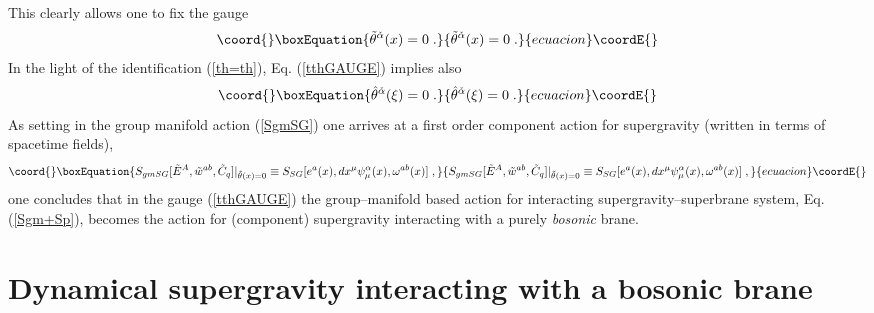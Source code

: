 \documentclass[a4paper,11pt]{article}
\begin{document}
This clearly allows one to fix the gauge 
 \begin{equation}\coord{}\boxEquation{
  \label{tthGAUGE} 
\tilde{\theta}^{\check{\alpha}}(x)=  0 \; .
}{
  \tilde{\theta}^{\check{\alpha}}(x)=  0 \; .
}{ecuacion}\coordE{}\end{equation}
In the light of the identification (\ref{th=th}), Eq. (\ref{tthGAUGE}) 
implies  also 
\begin{equation}\coord{}\boxEquation{
  \label{hth=0} 
\hat{\theta}^{\check{\alpha}}(\xi)=  0 \; .
}{
  \hat{\theta}^{\check{\alpha}}(\xi)=  0 \; .
}{ecuacion}\coordE{}\end{equation}
As setting \coordHE{} in the group manifold action 
(\ref{SgmSG}) one arrives at a first order component action for supergravity 
(written in terms of spacetime fields), 
\begin{equation}\coord{}\boxEquation{
 S_{gmSG}[\tilde{E}^A,\tilde{w}^{ab}, \tilde{C}_q]\vert_{\tilde{\theta}(x)=0}
\equiv S_{SG}[e^a(x), dx^\mu \psi_\mu^\alpha(x) , \omega^{ab}(x)]
\; , 
}{
 S_{gmSG}[\tilde{E}^A,\tilde{w}^{ab}, \tilde{C}_q]\vert_{\tilde{\theta}(x)=0}
\equiv S_{SG}[e^a(x), dx^\mu \psi_\mu^\alpha(x) , \omega^{ab}(x)]
\; , 
}{ecuacion}\coordE{}\end{equation}
one concludes that in the gauge (\ref{tthGAUGE}) the group--manifold 
based action for interacting supergravity--superbrane system, Eq. 
 (\ref{Sgm+Sp}), becomes the action for (component) supergravity 
interacting with a purely {\sl bosonic} brane.  

\section{Dynamical supergravity interacting with a bosonic brane} 
\end{document}
